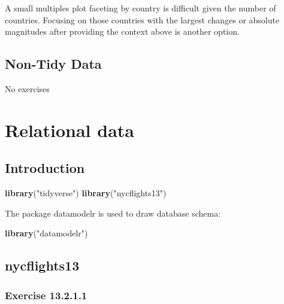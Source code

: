 \documentclass[]{book}
\newenvironment{Shaded}{\begin{snugshade}}{\end{snugshade}}
\newcommand{\KeywordTok}[1]{\textcolor[rgb]{0.13,0.29,0.53}{\textbf{#1}}}
\newcommand{\NormalTok}[1]{#1}
\newcommand{\StringTok}[1]{\textcolor[rgb]{0.31,0.60,0.02}{#1}}
\theoremstyle{plain}
\theoremstyle{remark}
\begin{document}
A small multiples plot faceting by country is difficult given the number
of countries. Focusing on those countries with the largest changes or
absolute magnitudes after providing the context above is another option.

\hypertarget{non-tidy-data}{%
\section{Non-Tidy Data}\label{non-tidy-data}}

No exercises

\hypertarget{relational-data}{%
\chapter{Relational data}\label{relational-data}}

\hypertarget{introduction-8}{%
\section{Introduction}\label{introduction-8}}

\begin{Shaded}
\begin{Highlighting}[]
\KeywordTok{library}\NormalTok{(}\StringTok{"tidyverse"}\NormalTok{)}
\KeywordTok{library}\NormalTok{(}\StringTok{"nycflights13"}\NormalTok{)}
\end{Highlighting}
\end{Shaded}

The package datamodelr is used to draw database schema:

\begin{Shaded}
\begin{Highlighting}[]
\KeywordTok{library}\NormalTok{(}\StringTok{"datamodelr"}\NormalTok{)}
\end{Highlighting}
\end{Shaded}

\hypertarget{nycflights13}{%
\section{nycflights13}\label{nycflights13}}

\hypertarget{exercise-13.2.1.1}{%
\subsection*{\texorpdfstring{Exercise
{13.2.1.1}}{Exercise 13.2.1.1}}\label{exercise-13.2.1.1}}
\end{document}
